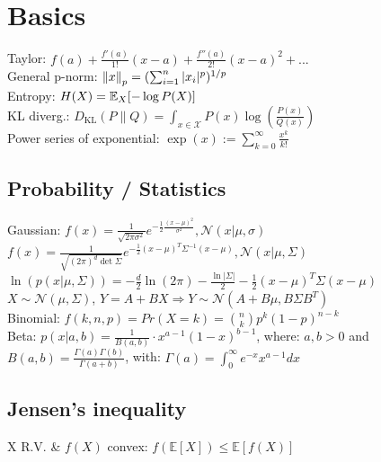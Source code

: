 \section{Basics}

Taylor: $f(a)+\tfrac{f'(a)}{1!}(x-a) + \tfrac{f''(a)}{2!}(x-a)^2 + ...$ \\
General p-norm: $\left\lVert x \right\rVert_p = (\sum_{i=1}^n |x_i|^p)^{1/p}$\\
Entropy: $H(X)=\mathbb E_X[-\log P(X)]$\\
KL diverg.: $D_\text{KL}(P \parallel Q) = \int_{x\in\mathcal{X}} P(x) \log\left(\frac{P(x)}{Q(x)}\right)$\\
Power series of exponential: $\exp(x) := \sum_{k = 0}^{\infty} \frac{x^k}{k!}$

\subsection*{Probability / Statistics}
Gaussian:
$f(x) = \frac{1}{\sqrt{2\pi \sigma^2}} e^{- \frac{1}{2} \frac{(x-\mu)^2}{\sigma^2}}, \mathcal{N}(x|\mu, \sigma)$\\
$f(x) = \frac{1}{\sqrt{(2\pi)^d\det\Sigma}} e^{- \frac{1}{2} (x-\mu)^T \Sigma^{-1} (x-\mu)}, \mathcal{N}(x|\mu, \Sigma)$\\
$\ln(p(x|\mu, \Sigma)) {=} {-}\tfrac{d}{2}\ln(2\pi) {-} \tfrac{\ln|\Sigma|}{2} {-} \tfrac{1}{2}(x{-}\mu)^T\Sigma(x{-}\mu)$ \\
$X {\sim} \mathcal{N}(\mu,\Sigma)$, $Y{=}A{+}BX \Rightarrow Y{\sim}\mathcal{N}(A{+}B\mu,B\Sigma B^T)$\\
Binomial: $f(k,n,p) {=} Pr(X=k) {=} \binom nk p^k (1{-}p)^{n{-}k}$\\
Beta: $p(x|a,b)=\frac{1}{B(a,b)}\cdot x^{a-1}(1-x)^{b-1}$, where: $a,b>0$ and $B(a,b)=\frac{\Gamma (a)\Gamma(b)}{\Gamma (a+b)}$, with: $\Gamma(a)=\int_0^\infty e^{-x}x^{a-1}dx$

\subsection*{Jensen's inequality}
	X R.V. \& $f(X)$ convex: $f(\mathbb{E}[X]) \leq \mathbb{E}[f(X)]$

